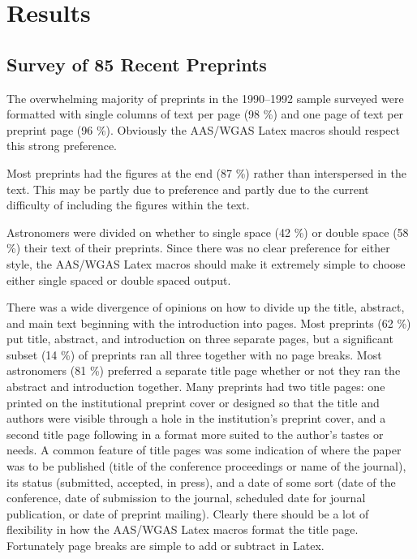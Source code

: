 \section
{Results}

\subsection{Survey of 85 Recent Preprints}

The overwhelming majority of preprints in the 1990--1992 sample surveyed 
were formatted with single columns of text per page (98 \%) and one page 
of text per preprint page (96 \%).  Obviously the AAS/WGAS Latex macros 
should respect this strong preference.

Most preprints had the figures at the end (87 \%) rather than interspersed 
in the text.  This may be partly due to preference and partly due to the 
current difficulty of including the figures within the text.

Astronomers were divided on whether to single space (42 \%) or double space
(58 \%) their text of their preprints.  Since there was no clear preference 
for either style, the AAS/WGAS Latex macros should make it extremely simple 
to choose either single spaced or double spaced output.

There was a wide divergence of opinions on how to divide up the title, 
abstract, and main text beginning with the introduction into pages.  Most 
preprints (62 \%) put title, abstract, and introduction on three separate 
pages, but a significant subset (14 \%) of preprints ran all three together 
with no page breaks.  Most astronomers (81 \%) preferred a separate title 
page whether or not they ran the abstract and introduction together.  Many 
preprints had two title pages: one printed on the institutional preprint 
cover or designed so that the title and authors were visible through a hole 
in the institution's preprint cover, and a second title page following in a 
format more suited to the author's tastes or needs.  A common feature of 
title pages was some indication of where the paper was to be published 
(title of the conference proceedings or name of the journal), its status 
(submitted, accepted, in press), and a date of some sort (date of the 
conference, date of submission to the journal, scheduled date for journal 
publication, or date of preprint mailing).  Clearly there should be a lot 
of flexibility in how the AAS/WGAS Latex macros format the title page.
Fortunately page breaks are simple to add or subtract in Latex.

